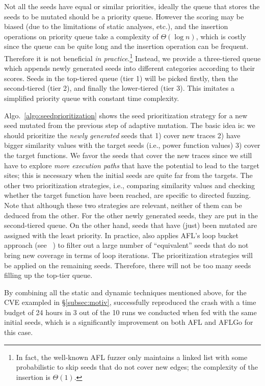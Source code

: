 Not all the seeds have equal or similar priorities, ideally the queue that stores the seeds to be mutated should be a priority queue. However the scoring may be biased (due to the limitations of static analyses, etc.), and the insertion operations on priority queue take a complexity of $\Theta(\log n)$, which is costly since the queue can be quite long and the insertion operation can be frequent. Therefore it is not beneficial \emph{in practice}.\footnote{In fact, the well-known AFL fuzzer only maintains a linked list with some probabilistic to skip seeds that do not cover new edges; the complexity of the  insertion  is $\Theta(1)$.} Instead, we provide a three-tiered queue which appends newly generated seeds into different categories according to their scores. Seeds in the top-tiered queue (tier 1) will be picked firstly, then the second-tiered (tier 2), and finally the lower-tiered (tier 3). This imitates a simplified priority queue with constant time complexity.
 
 
 Algo.~\ref{algo:seedprioritization} shows the seed prioritization strategy for a new seed mutated from the previous step of adaptive mutation. The basic idea is: we should prioritize the \emph{newly generated} seeds that 1) cover new traces 2) have bigger similarity values with the target seeds (i.e., power function values) 3) cover the target functions. We favor the seeds that cover the new traces since we still have to explore \emph{more execution paths} that have the potential to lead to the target sites; this is necessary when the initial seeds are quite far from the targets. The other two prioritization strategies, i.e., comparing similarity values and checking whether the target function have been reached, are specific to directed fuzzing. Note that although these two strategies are relevant, neither of them can be deduced from the other. For the other newly generated seeds, they are put in the second-tiered queue. On the other hand, seeds that have (just) been mutated are assigned with the least priority.
In practice, \dFOT also applies AFL's loop bucket approach (see ~\cite{afl_detail}) to filter out a large number of ``equivalent'' seeds that do not bring new coverage in terms of loop iterations. The prioritization strategies will be applied on the remaining seeds. Therefore, there will not be too many seeds filling up the top-tier queue.

By combining all the static and dynamic techniques mentioned above, for the CVE exampled in \S\ref{subsec:motiv}, \dFOT successfully reproduced the crash with a time budget of 24 hours in 3 out of the 10 runs we conducted when fed with the same initial seeds, which is a significantly improvement on both AFL and AFLGo for this case.
 






